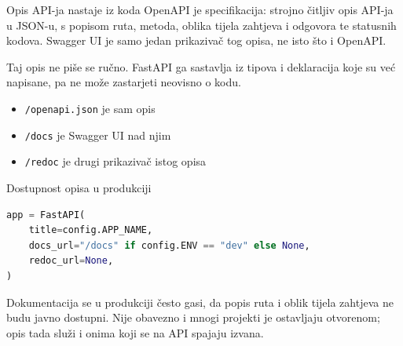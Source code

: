 \begin{frame}{Opis API-ja nastaje iz koda}
OpenAPI je specifikacija: strojno čitljiv opis API-ja u JSON-u, s popisom ruta, metoda, oblika tijela zahtjeva i odgovora te statusnih kodova. Swagger UI je samo jedan prikazivač tog opisa, ne isto što i OpenAPI.

\vspace{0.4em}
Taj opis ne piše se ručno. FastAPI ga sastavlja iz tipova i deklaracija koje su već napisane, pa ne može zastarjeti neovisno o kodu.

\vspace{0.4em}
\begin{itemize}
  \item \texttt{/openapi.json} je sam opis
  \item \texttt{/docs} je Swagger UI nad njim
  \item \texttt{/redoc} je drugi prikazivač istog opisa
\end{itemize}

\end{frame}

\begin{frame}[fragile]{Dostupnost opisa u produkciji}
\begin{lstlisting}[language=python]
app = FastAPI(
    title=config.APP_NAME,
    docs_url="/docs" if config.ENV == "dev" else None,
    redoc_url=None,
)
\end{lstlisting}

\vspace{0.4em}
\begin{konvencija}
Dokumentacija se u produkciji često gasi, da popis ruta i oblik tijela zahtjeva ne budu javno dostupni. Nije obavezno i mnogi projekti je ostavljaju otvorenom; opis tada služi i onima koji se na API spajaju izvana.
\end{konvencija}

\end{frame}


